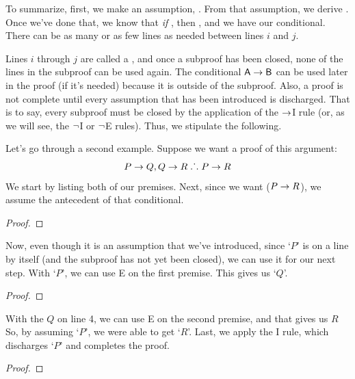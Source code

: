 To summarize, first, we make an assumption, . From that assumption, we derive . Once we've done that, we know that \textit{if} , then , and we have our conditional. 
\noindent There can be as many or as few lines as needed between lines $i$ and $j$. 

Lines $i$ through $j$ are called a , and once a subproof has been closed, none of the lines in the subproof can be used again. The conditional $\mathsf{A}\rightarrow\mathsf{B}$ can be used later in the proof (if it's needed) because it is outside of the subproof. Also, a proof is not complete until every assumption that has been introduced is discharged. That is to say, every subproof must be closed by the application of the $\rightarrow$I rule (or, as we will see, the ${\neg}$I or ${\neg}$E rules).
Thus, we stipulate the following.


Let's go through a second example. Suppose we want a proof of this argument:
	$$P \rightarrow Q, Q \rightarrow R \mathrel{\ldotp\dot{}\,\ldotp} P \rightarrow R$$
We start by listing both of our premises. Next, since we want ($P \rightarrow R$), we assume the antecedent of that conditional. 
\begin{proof}
	 
	 
	\open
		 
	\close
\end{proof}
Now, even though it is an assumption that we've introduced, since `$P$' is on a line by itself (and the subproof has not yet been closed), we can use it for our next step. With `$P$', we can use {\eif}E on the first premise. This gives us `$Q$'. 
\begin{proof}
	 
	 
	\open
	\close
\end{proof}
With the $Q$ on line 4, we can use {\eif}E on the second premise, and that gives us $R$ So, by assuming `$P$', we were able to get `$R$'. Last, we apply the {\eif}I rule, which discharges `$P$' and completes the proof.
\label{HSproof}
\begin{proof}
	 
	 
	\open
	\close
\end{proof}

